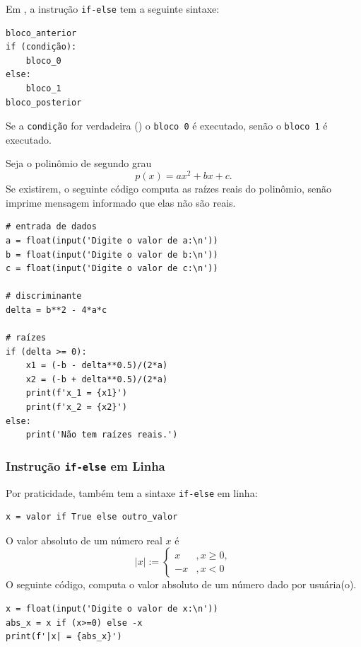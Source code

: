 Em {\python}, a instrução \lstinline+if-else+ tem a seguinte sintaxe:

\begin{lstlisting}
bloco_anterior
if (condição):
    bloco_0
else:
    bloco_1
bloco_posterior
\end{lstlisting}

Se a {\lstinline+condição+} for verdadeira ({\PYTHONTrue}) o {\lstinline+bloco 0+} é executado, senão o {\lstinline+bloco 1+} é executado.

\begin{ex}
  Seja o polinômio de segundo grau
  \begin{equation}
    p(x) = ax^2 + bx + c.
  \end{equation}
  Se existirem, o seguinte código computa as raízes reais do polinômio, senão imprime mensagem informado que elas não são reais.

\begin{lstlisting}
# entrada de dados
a = float(input('Digite o valor de a:\n'))
b = float(input('Digite o valor de b:\n'))
c = float(input('Digite o valor de c:\n'))

# discriminante
delta = b**2 - 4*a*c

# raízes
if (delta >= 0):
    x1 = (-b - delta**0.5)/(2*a)
    x2 = (-b + delta**0.5)/(2*a)
    print(f'x_1 = {x1}')
    print(f'x_2 = {x2}')
else:
    print('Não tem raízes reais.')
\end{lstlisting}

\end{ex}

\subsubsection{Instrução \lstinline+if-else+ em Linha}

Por praticidade, {\python} também tem a sintaxe \lstinline+if-else+ em linha:

\begin{lstlisting}
x = valor if True else outro_valor
\end{lstlisting}

\begin{ex}
  O valor absoluto de um número real $x$ é
  \begin{equation}
    |x| := \left\{
      \begin{array}{ll}
        x &, x\geq 0,\\
        -x &, x<0
      \end{array}
    \right.
  \end{equation}
  O seguinte código, computa o valor absoluto de um número dado por usuária(o).
  
\begin{lstlisting}
x = float(input('Digite o valor de x:\n'))
abs_x = x if (x>=0) else -x
print(f'|x| = {abs_x}')
\end{lstlisting}

\end{ex}

